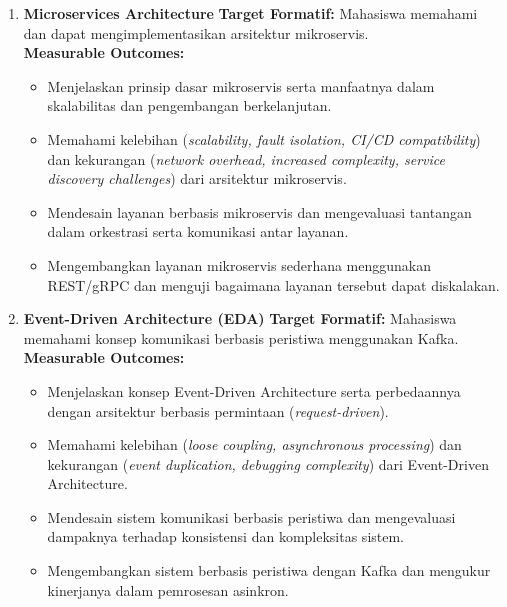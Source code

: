 \begin{enumerate}
\item \textbf{Microservices Architecture}  
\textbf{Target Formatif:} Mahasiswa memahami dan dapat mengimplementasikan arsitektur mikroservis.  \\
\textbf{Measurable Outcomes:}
\begin{itemize}
\item Menjelaskan prinsip dasar mikroservis serta manfaatnya dalam skalabilitas dan pengembangan berkelanjutan.
\item Memahami kelebihan (\textit{scalability, fault isolation, CI/CD compatibility}) dan kekurangan (\textit{network overhead, increased complexity, service discovery challenges}) dari arsitektur mikroservis.
\item Mendesain layanan berbasis mikroservis dan mengevaluasi tantangan dalam orkestrasi serta komunikasi antar layanan.
\item Mengembangkan layanan mikroservis sederhana menggunakan REST/gRPC dan menguji bagaimana layanan tersebut dapat diskalakan.
\end{itemize}

\item \textbf{Event-Driven Architecture (EDA)}  
\textbf{Target Formatif:} Mahasiswa memahami konsep komunikasi berbasis peristiwa menggunakan Kafka.  \\
\textbf{Measurable Outcomes:}
\begin{itemize}
\item Menjelaskan konsep Event-Driven Architecture serta perbedaannya dengan arsitektur berbasis permintaan (\textit{request-driven}).
\item Memahami kelebihan (\textit{loose coupling, asynchronous processing}) dan kekurangan (\textit{event duplication, debugging complexity}) dari Event-Driven Architecture.
\item Mendesain sistem komunikasi berbasis peristiwa dan mengevaluasi dampaknya terhadap konsistensi dan kompleksitas sistem.
\item Mengembangkan sistem berbasis peristiwa dengan Kafka dan mengukur kinerjanya dalam pemrosesan asinkron.
\end{itemize}


\end{enumerate}
